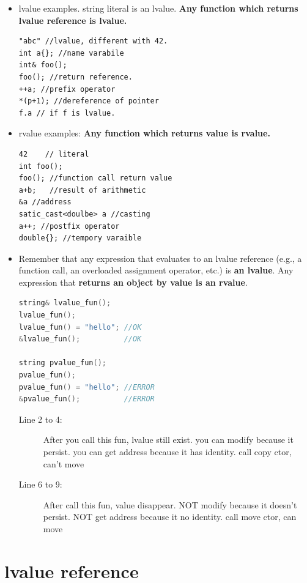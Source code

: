 \documentclass[a4paper,11pt,twoside]{book}
\begin{document}
\begin{itemize}
\item lvalue examples. string literal is an lvalue. \textbf{Any function which returns lvalue reference is lvalue.}
\begin{lstlisting}
"abc" //lvalue, different with 42.
int a{}; //name varabile 
int& foo();
foo(); //return reference.
++a; //prefix operator
*(p+1); //dereference of pointer
f.a // if f is lvalue.
\end{lstlisting}
	
	\item rvalue examples: \textbf{Any function which returns value is rvalue.}
\begin{lstlisting}
42    // literal
int foo(); 
foo(); //function call return value
a+b;   //result of arithmetic
&a //address 
satic_cast<doulbe> a //casting
a++; //postfix operator
double{}; //tempory varaible
\end{lstlisting}

	\item Remember that any expression that evaluates to an lvalue reference (e.g., a function call, an overloaded assignment operator, etc.) is \textbf{an lvalue}. Any expression that \textbf{returns an object by value is an rvalue}.

\begin{lstlisting}[frame=single, language=c++, mathescape=true]
string& lvalue_fun();
lvalue_fun(); 
lvalue_fun() = "hello"; //OK
&lvalue_fun();          //OK
	
string pvalue_fun();
pvalue_fun(); 
pvalue_fun() = "hello"; //ERROR
&pvalue_fun();          //ERROR
\end{lstlisting}

\begin{description}
	\item[Line 2 to 4:] After you call this fun, lvalue still exist. you can modify because it persist. you can get address because it has identity. call copy ctor, can't move
	
	\item[Line 6 to 9:]  After call this fun, value disappear. NOT modify because it doesn't persist. NOT get address because it no identity. call move ctor, can move
\end{description}


\end{itemize}

\section{lvalue reference}
\end{document}
